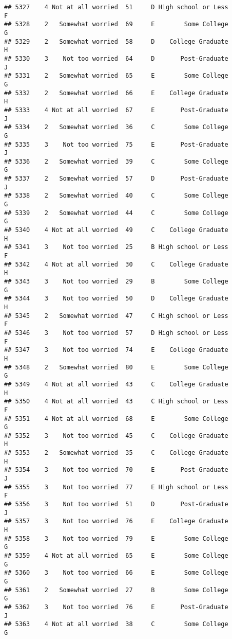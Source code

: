\documentclass[
]{article}
\begin{document}
\begin{verbatim}
## 5327    4 Not at all worried  51     D High school or Less         F
## 5328    2   Somewhat worried  69     E        Some College         G
## 5329    2   Somewhat worried  58     D    College Graduate         H
## 5330    3    Not too worried  64     D       Post-Graduate         J
## 5331    2   Somewhat worried  65     E        Some College         G
## 5332    2   Somewhat worried  66     E    College Graduate         H
## 5333    4 Not at all worried  67     E       Post-Graduate         J
## 5334    2   Somewhat worried  36     C        Some College         G
## 5335    3    Not too worried  75     E       Post-Graduate         J
## 5336    2   Somewhat worried  39     C        Some College         G
## 5337    2   Somewhat worried  57     D       Post-Graduate         J
## 5338    2   Somewhat worried  40     C        Some College         G
## 5339    2   Somewhat worried  44     C        Some College         G
## 5340    4 Not at all worried  49     C    College Graduate         H
## 5341    3    Not too worried  25     B High school or Less         F
## 5342    4 Not at all worried  30     C    College Graduate         H
## 5343    3    Not too worried  29     B        Some College         G
## 5344    3    Not too worried  50     D    College Graduate         H
## 5345    2   Somewhat worried  47     C High school or Less         F
## 5346    3    Not too worried  57     D High school or Less         F
## 5347    3    Not too worried  74     E    College Graduate         H
## 5348    2   Somewhat worried  80     E        Some College         G
## 5349    4 Not at all worried  43     C    College Graduate         H
## 5350    4 Not at all worried  43     C High school or Less         F
## 5351    4 Not at all worried  68     E        Some College         G
## 5352    3    Not too worried  45     C    College Graduate         H
## 5353    2   Somewhat worried  35     C    College Graduate         H
## 5354    3    Not too worried  70     E       Post-Graduate         J
## 5355    3    Not too worried  77     E High school or Less         F
## 5356    3    Not too worried  51     D       Post-Graduate         J
## 5357    3    Not too worried  76     E    College Graduate         H
## 5358    3    Not too worried  79     E        Some College         G
## 5359    4 Not at all worried  65     E        Some College         G
## 5360    3    Not too worried  66     E        Some College         G
## 5361    2   Somewhat worried  27     B        Some College         G
## 5362    3    Not too worried  76     E       Post-Graduate         J
## 5363    4 Not at all worried  38     C        Some College         G

\end{verbatim}
\end{document}
